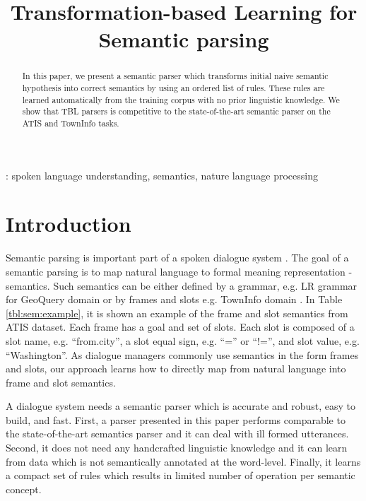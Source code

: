 \documentclass{article}
\title{Transformation-based Learning for Semantic parsing}
\begin{document}
\maketitle
%
\begin{abstract}
In this paper, we present a semantic parser which transforms initial naive semantic hypothesis into correct semantics by using an ordered list of rules. These rules are learned automatically from the training corpus with no prior linguistic knowledge. We show that TBL parsers is competitive to the state-of-the-art semantic parser on the ATIS and TownInfo tasks. 
\end{abstract}
\vspace{0.1cm}
: spoken language understanding, semantics, nature language processing


\section{Introduction}
Semantic parsing is important part of a spoken dialogue system \cite{williams07}. The goal of a semantic parsing is to map natural language to formal meaning representation - semantics. Such semantics can be either defined by a grammar, e.g. LR grammar for GeoQuery domain \cite{kate05} or by frames and slots e.g. TownInfo domain \cite{thomson08}. In Table \ref{tbl:sem:example}, it is shown an example of the frame and slot semantics from ATIS dataset. Each frame has a goal and set of slots. Each slot is composed of a slot name, e.g. ``from.city'', a slot equal sign, e.g. ``='' or ``!='', and slot value, e.g. ``Washington''. As dialogue managers commonly use semantics in the form frames and slots, our approach learns how to directly map from natural language into frame and slot semantics.



A dialogue system needs a semantic parser which is accurate and robust, easy to build, and fast. First, a parser presented in this paper performs comparable to the state-of-the-art semantics parser and it can deal with ill formed utterances. Second, it does not need any handcrafted linguistic knowledge and it can learn from data which is not semantically annotated at the word-level. Finally, it learns a compact set of rules which results in limited number of operation per semantic concept.
\end{document}
